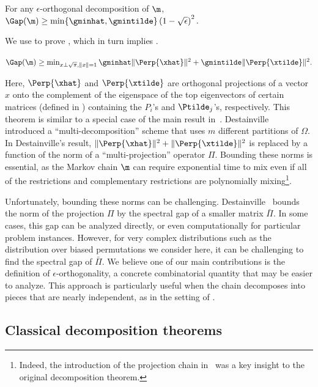 \documentclass{toc}
\begin{document}
\begin{theorem}\label{thm:indep}
For any $\epsilon$-orthogonal decomposition of $\m$, $\Gap(\m) 
\geq \min\{\gminhat, \gmintilde\}\left(1 -\sqrt{\epsilon}\right)^2.$
\end{theorem}

\noindent
We use  to prove ,
which in turn implies .

\begin{theorem}\label{thm:primaldual}
$\Gap(\m)\geq \min_{x\perp \sqrt{\pi}, \|x\|=1}  
\gminhat\|\Perp{\xhat}\|^2+\gmintilde\|\Perp{\xtilde}\|^2.$
\end{theorem}

Here, $\Perp{\xhat}$ and $\Perp{\xtilde}$ are orthogonal projections of 
a vector $x$ onto the complement of the eigenspace of the top 
eigenvectors of certain matrices (defined in ) 
containing the $P_i$'s and $\Ptilde_j$'s, respectively. This theorem is 
similar to a special case of the main result in~\cite{Dest03}. 
Destainville~\cite{Dest03} introduced a ``multi-decomposition'' scheme 
that uses $m$ different partitions of $\Omega$. In Destainville's 
result, $\|\Perp{\xhat}\|^2+\|\Perp{\xtilde}\|^2$ is replaced by a 
function of the norm of a ``multi-projection'' operator $\Pi$. Bounding 
these norms is essential, as the Markov chain $\m$ can require 
exponential time to mix even if all of the restrictions and 
complementary restrictions are polynomially mixing\footnote{Indeed, the 
introduction of the projection chain in~\cite{madr} was a key insight 
to the original decomposition theorem.}.

Unfortunately, bounding these norms can be challenging. 
Destainville~\cite{Dest03} bounds the norm of the projection $\Pi$ by 
the spectral gap of a smaller matrix $\bar{\Pi}$. In some cases, this 
gap can be analyzed directly, or even computationally for particular 
problem instances. However, for very complex distributions such as the 
distribution over biased permutations we consider here, it can be 
challenging to find the spectral gap of $\bar{\Pi}$. We believe one of 
our main contributions is the definition of $\epsilon$-orthogonality, a 
concrete combinatorial quantity that may be easier to analyze.  This 
approach is particularly useful when the chain decomposes into pieces 
that are nearly independent, as in the setting of 
.

\subsection{Classical decomposition theorems}\label{sec:classcomp}
\end{document}
